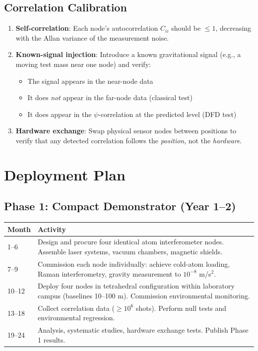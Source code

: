 \documentclass[12pt,a4paper]{article}
\begin{document}
\subsection{Correlation Calibration}

\begin{enumerate}
\item \textbf{Self-correlation}: Each node's autocorrelation $C_{ii}$
should be $\leq 1$, decreasing with the Allan variance of the
measurement noise.

\item \textbf{Known-signal injection}: Introduce a known gravitational
signal (e.g., a moving test mass near one node) and verify:
\begin{itemize}
\item The signal appears in the near-node data
\item It does \emph{not} appear in the far-node data (classical test)
\item It does appear in the $\psi$-correlation at the predicted level
(DFD test)
\end{itemize}

\item \textbf{Hardware exchange}: Swap physical sensor nodes between
positions to verify that any detected correlation follows the
\emph{position}, not the \emph{hardware}.
\end{enumerate}


\section{Deployment Plan}\label{sec:deployment}

\subsection{Phase 1: Compact Demonstrator (Year 1--2)}

\begin{table}[H]
\centering
\begin{tabular}{lp{10cm}}
\toprule
\textbf{Month} & \textbf{Activity} \\
\midrule
1--6 & Design and procure four identical atom interferometer nodes.
Assemble laser systems, vacuum chambers, magnetic shields. \\
7--9 & Commission each node individually: achieve cold-atom loading,
Raman interferometry, gravity measurement to $10^{-8}$ m/s$^2$. \\
10--12 & Deploy four nodes in tetrahedral configuration within
laboratory campus (baselines 10--100 m). Commission environmental
monitoring. \\
13--18 & Collect correlation data ($\geq 10^6$ shots). Perform null
tests and environmental regression. \\
19--24 & Analysis, systematic studies, hardware exchange tests.
Publish Phase 1 results. \\
\bottomrule
\end{tabular}
\end{table}
\end{document}
